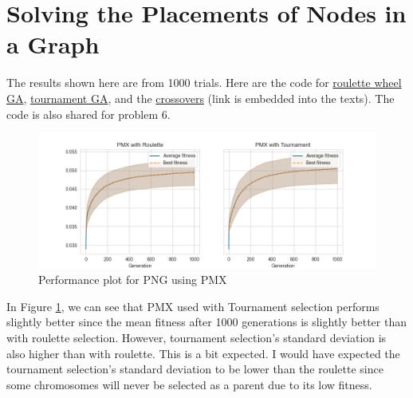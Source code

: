 \section{Solving the Placements of Nodes in a Graph}

The results shown here are from 1000 trials. Here are the code for \href{https://github.com/nngerncham/ma395_heuristic/blob/main/homework/hw4/code/src/main/scala/GARouletteWheel.scala}{roulette wheel GA}, \href{https://github.com/nngerncham/ma395_heuristic/blob/main/homework/hw4/code/src/main/scala/GATournament.scala}{tournament GA}, and the \href{https://github.com/nngerncham/ma395_heuristic/blob/main/homework/hw4/code/src/main/scala/Crossovers.scala}{crossovers} (link is embedded into the texts). The code is also shared for problem 6.

\begin{figure}[ht]
    \centering
    \includegraphics[width=\textwidth]{../images/p56/p56pmx.png}
    \caption{Performance plot for PNG using PMX}
    \label{fig:p5a}
\end{figure}

In Figure \ref{fig:p5a}, we can see that PMX used with Tournament selection performs slightly better since the mean fitness after 1000 generations is slightly better than with roulette selection. However, tournament selection's standard deviation is also higher than with roulette. This is a bit expected. I would have expected the tournament selection's standard deviation to be lower than the roulette since some chromosomes will never be selected as a parent due to its low fitness.
